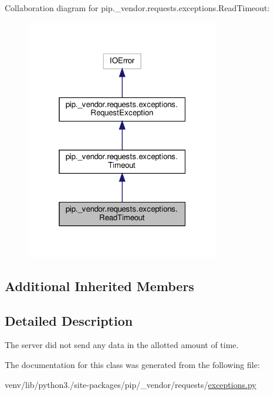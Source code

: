 Collaboration diagram for pip.\+\_\+vendor.\+requests.\+exceptions.\+Read\+Timeout\+:
\nopagebreak
\begin{figure}[H]
\begin{center}
\leavevmode
\includegraphics[width=241pt]{classpip_1_1__vendor_1_1requests_1_1exceptions_1_1ReadTimeout__coll__graph}
\end{center}
\end{figure}
\subsection*{Additional Inherited Members}


\subsection{Detailed Description}
\begin{DoxyVerb}The server did not send any data in the allotted amount of time.\end{DoxyVerb}
 

The documentation for this class was generated from the following file\+:\begin{DoxyCompactItemize}
\item 
venv/lib/python3./site-\/packages/pip/\+\_\+vendor/requests/\hyperlink{pip_2__vendor_2requests_2exceptions_8py}{exceptions.\+py}\end{DoxyCompactItemize}
